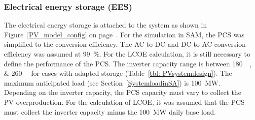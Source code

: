 \clearpage
\subsubsection{Electrical energy storage (EES)}

The electrical energy storage is attached to the system as shown in Figure~\ref{PV_model_config} on page~\pageref{PV_model_config}. For the simulation in \ac{SAM}, the \ac{PCS} was simplified to the conversion efficiency. The \ac{AC} to \ac{DC} and \ac{DC} to \ac{AC} conversion efficiency was assumed at \SI{99}{\percent}. For the \ac{LCOE} calculation, it is still necessary to define the performance of the \ac{PCS}. The inverter capacity range is between \SIlist{180;260}{\mega\wattsac} for cases with adapted storage (Table~\ref{tbl: PVsystemdesign}). The maximum anticipated load (see Section~\ref{SystemloadinSA}) is \SI{100}{\mega\watt}. Depending on the inverter capacity, the \ac{PCS} capacity must vary to collect the  \ac{PV} overproduction. For the calculation of \ac{LCOE}, it was assumed that the \ac{PCS} must collect the inverter capacity minus the \SI{100}{MW} daily base load.


